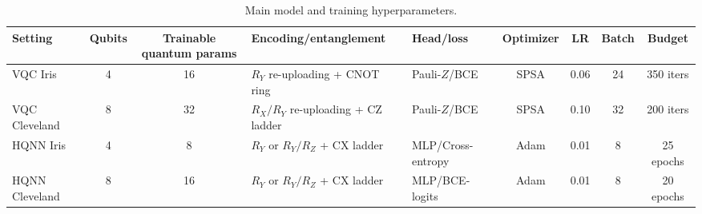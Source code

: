 \begin{table}[!t]
\centering
\caption{Main model and training hyperparameters.}
\label{tab:hyperparameters}
\scriptsize
\begin{tabular}{@{}lccp{3.0cm}p{1.8cm}cccc@{}}
\toprule
Setting & Qubits & Trainable quantum params & Encoding/entanglement & Head/loss & Optimizer & LR & Batch & Budget \\
\midrule
VQC Iris & 4 & 16 & $R_Y$ re-uploading + CNOT ring & Pauli-$Z$/BCE & SPSA & 0.06 & 24 & 350 iters \\
VQC Cleveland & 8 & 32 & $R_X/R_Y$ re-uploading + CZ ladder & Pauli-$Z$/BCE & SPSA & 0.10 & 32 & 200 iters \\
HQNN Iris & 4 & 8 & $R_Y$ or $R_Y/R_Z$ + CX ladder & MLP/Cross-entropy & Adam & 0.01 & 8 & 25 epochs \\
HQNN Cleveland & 8 & 16 & $R_Y$ or $R_Y/R_Z$ + CX ladder & MLP/BCE-logits & Adam & 0.01 & 8 & 20 epochs \\
\bottomrule
\end{tabular}
\end{table}
